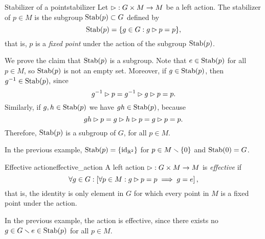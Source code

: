 \begin{definition}{Stabilizer of a point}{stabilizer}
    Let \(\mathbin{\vartriangleright} : G \times M \to M\) be a left action. The stabilizer of \(p \in M\) is the subgroup \(\operatorname{Stab}(p) \subset G\) defined by
    \begin{equation*}
        \operatorname{Stab}(p) = \{g \in G : g \mathbin{\vartriangleright} p = p\},
    \end{equation*}
    that is, \(p\) is a \emph{fixed point} under the action of the subgroup \(\operatorname{Stab}(p)\).
\end{definition}
\begin{remark}
    We prove the claim that \(\operatorname{Stab}(p)\) is a subgroup. Note that \(e \in \operatorname{Stab}(p)\) for all \(p \in M\), so \(\operatorname{Stab}(p)\) is not an empty set. Moreover, if \(g\in \operatorname{Stab}(p)\), then \(g^{-1} \in \operatorname{Stab}(p),\) since
    \begin{equation*}
        g^{-1} \mathbin{\vartriangleright} p = g^{-1} \mathbin{\vartriangleright} g \mathbin{\vartriangleright} p = p.
    \end{equation*}
    Similarly, if \(g, h \in \operatorname{Stab}(p)\) we have \(gh \in \operatorname{Stab}(p)\), because
    \begin{equation*}
        gh \mathbin{\vartriangleright} p = g \mathbin{\vartriangleright} h \mathbin{\vartriangleright} p = g \mathbin{\vartriangleright} p = p.
    \end{equation*}
    Therefore, \(\operatorname{Stab}(p)\) is a subgroup of \(G\), for all \(p \in M\).
\end{remark}
\begin{example}
    In the previous example, \(\operatorname{Stab}(p) = \{\operatorname{id}_{\mathbb{R}^2}\}\) for \(p \in M \smallsetminus \{0\}\) and \(\operatorname{Stab}(0) = G\).
\end{example}

\begin{definition}{Effective action}{effective_action}
    A left action \(\mathbin{\vartriangleright} : G \times M \to M\) is \emph{effective} if
    \begin{equation*}
        \forall g \in G : \left[\forall p \in M : g \mathbin{\vartriangleright} p = p \implies g = e\right],
    \end{equation*}
    that is, the identity is only element in \(G\) for which every point in \(M\) is a fixed point under the action.
\end{definition}
\begin{example}
    In the previous example, the action is effective, since there exists no \(g \in G \smallsetminus {e} \in \operatorname{Stab}(p)\) for all \(p \in M\).
\end{example}

